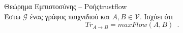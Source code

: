 {}
\begin{theoremgr}{Θεώρημα Εμπιστοσύνης -- Ροής}{trustflow} \ \\
  Έστω $\mathcal{G}$ ένας γράφος παιχνιδιού και $A, B \in \mathcal{V}$. Ισχύει ότι
  \begin{equation*}
    Tr_{A \rightarrow B} = maxFlow\left(A, B\right) \enspace.
  \end{equation*}
\end{theoremgr}

